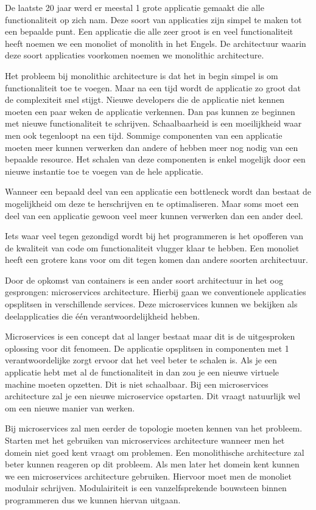 \documentclass[pdftex,a4paper,12pt,twoside]{report}
\begin{document}
De laatste 20 jaar werd er meestal 1 grote applicatie gemaakt die alle functionaliteit op zich nam. Deze soort van applicaties zijn simpel te maken tot een bepaalde punt. Een applicatie die alle zeer groot is en veel functionaliteit heeft noemen we een monoliet of monolith in het Engels. De architectuur waarin deze soort applicaties voorkomen noemen we monolithic architecture. 

Het probleem bij monolithic architecture is dat het in begin simpel is om functionaliteit toe te voegen. Maar na een tijd wordt de applicatie zo groot dat de complexiteit snel stijgt. Nieuwe developers die de applicatie niet kennen moeten een paar weken de applicatie verkennen. Dan pas kunnen ze beginnen met nieuwe functionaliteit te schrijven. Schaalbaarheid is een moeilijkheid waar men ook tegenloopt na een tijd. Sommige componenten van een applicatie moeten meer kunnen verwerken dan andere of hebben meer nog nodig van een bepaalde resource. Het schalen van deze componenten is enkel mogelijk door een nieuwe instantie toe te voegen van de hele applicatie. 

Wanneer een bepaald deel van een applicatie een bottleneck wordt dan bestaat de mogelijkheid om deze te herschrijven en te optimaliseren. Maar soms moet een deel van een applicatie gewoon veel meer kunnen verwerken dan een ander deel. 

Iets waar veel tegen gezondigd wordt bij het programmeren is het opofferen van de kwaliteit van code om functionaliteit vlugger klaar te hebben. Een monoliet heeft een grotere kans voor om dit tegen komen dan andere soorten architectuur. 

Door de opkomst van containers is een ander soort architectuur in het oog gesprongen: microservices architecture. Hierbij gaan we conventionele applicaties opsplitsen in verschillende services. Deze microservices kunnen we bekijken als deelapplicaties die één verantwoordelijkheid hebben.

Microservices is een concept dat al langer bestaat maar dit is de uitgesproken oplossing voor dit fenomeen. De applicatie opsplitsen in componenten met 1 verantwoordelijke zorgt ervoor dat het veel beter te schalen is. Als je een applicatie hebt met al de functionaliteit in dan zou je een nieuwe virtuele machine moeten opzetten. Dit is niet schaalbaar. Bij een microservices architecture zal je een nieuwe microservice opstarten. Dit vraagt natuurlijk wel om een nieuwe manier van werken.

Bij microservices zal men eerder de topologie moeten kennen van het probleem. Starten met het gebruiken van microservices architecture wanneer men het domein niet goed kent vraagt om problemen. Een monolithische architecture zal beter kunnen reageren op dit probleem. Als men later het domein kent kunnen we een microservices architecture gebruiken. Hiervoor moet men de monoliet modulair schrijven. Modulairiteit is een vanzelfsprekende bouwsteen binnen programmeren dus we kunnen hiervan uitgaan.
\end{document}
